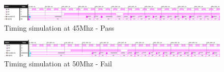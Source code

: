 \documentclass[CMPE]{../KGCOEReport}
\begin{document}
	\begin{figure}[h!]
        \centering
        \includegraphics[width=\textwidth]{img/impl_45Mhz}
        \caption{Timing simulation at 45Mhz - Pass}
        \label{fig:demo1}
	\end{figure}
    
	\begin{figure}[h!]
        \centering
        \includegraphics[width=\textwidth]{img/impl_50Mhz}
        \caption{Timing simulation at 50Mhz - Fail}
        \label{fig:demo1}
	\end{figure}
\end{document}
